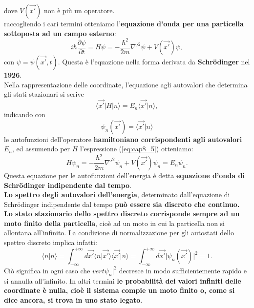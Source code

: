 \documentclass[a4paper,12pt,oneside]{book}
\begin{document}
dove $V(\vec{x'})$ non è più un operatore.\\
raccogliendo i cari termini otteniamo l'\textbf{equazione d'onda per una particella sottoposta ad un campo esterno}:
\begin{equation}
i\hbar \frac{\partial \psi}{\partial t} = H\psi = -\frac{\hbar ^2}{2m}{\nabla '} ^2 \psi + V(\vec{x'}) \psi,
\end{equation}
con $\psi =\psi(\vec{x'}, t)$. Questa è l'equazione nella forma derivata da \textbf{Schr\"{o}dinger} nel \textbf{1926}.\\
Nella rappresentazione delle coordinate, l'equazione agli autovalori che determina gli stati stazionari si scrive
\begin{equation}
\langle \vec{x'}\vert H \vert n \rangle = E_n\langle \vec{x'} \vert n \rangle,
\end{equation}
indicando con
\begin{equation}
\psi _n (\vec{x'}) = \langle \vec{x'} \vert n \rangle
\end{equation}
le autofunzioni dell'operatore \textbf{hamiltoniano corrispondenti agli autovalori $E_n$}, ed assumendo per $H$ l'espressione (\ref{eq:cap8_5}) otteniamo:
\begin{equation}
H\psi _n = -\frac{\hbar ^ 2}{2m}{\nabla '}^2 \psi _n + V(\vec{x'})\psi _n = E_n \psi _n.
\end{equation}
Questa equazione per le autofunzioni dell'energia è detta \textbf{equazione d'onda di Schr\"{o}dinger indipendente dal tempo}.\\
\textbf{Lo spettro degli autovalori dell'energia}, determinato dall'equazione di Schr\"{o}dinger indipendente dal tempo \textbf{può essere sia discreto che continuo. Lo stato stazionario dello spettro discreto corrisponde sempre ad un moto finito della particella}, cioè ad un moto in cui la particella non si allontana all'infinito. La condizione di normalizzazione per gli autostati dello spettro discreto implica infatti:
\begin{equation}
\langle n \vert n \rangle = \int _{- \infty} ^{+\infty} d\vec{x'}\langle n \vert \vec{x'} \rangle \langle \vec{x'} \vert n \rangle = \int _{- \infty} ^{+\infty} d\vec{x'} \vert \psi _n (\vec{x'}) \vert ^2 =1.
\end{equation}
Ciò significa in ogni caso che $ vert \psi _n  \vert ^2$ decresce in modo sufficientemente rapido e si annulla all'infinito. In altri termini \textbf{le probabilità dei valori infiniti delle coordinate è nulla, cioè il sistema compie un moto finito o, come si dice ancora, si trova in uno stato legato}.\\
\end{document}
